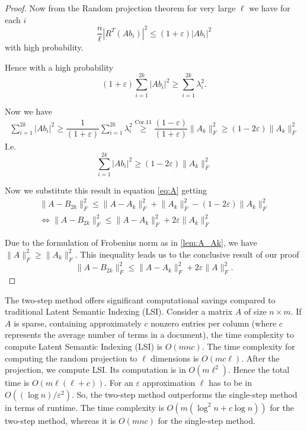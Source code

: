 \documentclass[a4paper,11pt,DIV=15]{scrartcl} %
\renewcommand{\epsilon}{\varepsilon}
\theoremstyle{plain}
\theoremstyle{definition}
\begin{document}
\begin{proof}
Now from the Random projection theorem for very large $\ell$ we have for each $i$
\[
 \dfrac{n}{\ell}| R^T (Ab_i)|^2 \leq (1+\epsilon) |Ab_i|^2
\]
with high probability.

Hence with a high probability
\[
(1+\epsilon) \sum_{i=1}^{2k} |A b_i|^2 \geq \sum_{i=1}^{2k} \lambda_i^2.
\]

Now we have
\begin{align*}
    \sum_{i=1}^{2k} |A b_i|^2 \geq \dfrac{1}{(1+\epsilon)} \sum_{i=1}^{2k} \lambda_i^2 
    \overset{\text{Cor.11}}{\geq} \dfrac{(1-\epsilon)}{(1+\epsilon)} \lVert A_k \rVert_F^2 
    \geq (1-2\epsilon) \lVert A_k \rVert_F^2
\end{align*}
I.e.
\[
\sum_{i=1}^{2k} |A b_i|^2 \geq (1-2\epsilon) \lVert A_k \rVert_F^2
\]

Now we substitute this result in equation \ref{eq:A} getting
\begin{align*}
    \lVert A - B_{2k} \rVert_F^2 \leq \lVert A - A_k \rVert_F^2 + \lVert A_k \rVert_F^2 - (1-2\epsilon) \lVert A_k \rVert_F^2\\
\iff \lVert A - B_{2k} \rVert_F^2 \leq \lVert A - A_k \rVert_F^2 + 2\epsilon\lVert A_k \rVert_F^2
\end{align*}

Due to the formulation of Frobenius norm as in \ref{lem:A_Ak}, %
 we have  $\lVert A \rVert_F^2 \geq \lVert A_k \rVert_F^2$. This inequality leads us to the conclusive result of our proof
\[
\lVert A - B_{2k} \rVert_F^2 \leq \lVert A - A_k \rVert_F^2 + 2\epsilon\lVert A \rVert_F^2.
\]
\end{proof}

The two-step method offers significant computational savings compared to traditional Latent Semantic Indexing (LSI).
Consider a matrix \( A \) of size \( n \times m \). If \( A \) is sparse, containing approximately \( c \) nonzero entries per column (where \( c \) represents the average number of terms in a document), the time complexity to compute Latent Semantic Indexing (LSI) is \( O(mnc) \).
The time complexity for computing the random projection to \( \ell \) dimensions is \( O(mc\ell) \).
After the projection, we compute LSI. Its computation is in $O(m\ell^2)$. Hence the total time is $O(m\ell(\ell+c))$.
For an $\epsilon$ approximation $\ell$ has to be in $O((\log n)/\epsilon^2)$. 
So, the two-step method outperforms the single-step method in terms of runtime. The time complexity is \(O(m(\log^2 n + c \log n))\) for the two-step method, whereas it is \(O(mnc)\) for the single-step method.
\end{document}
